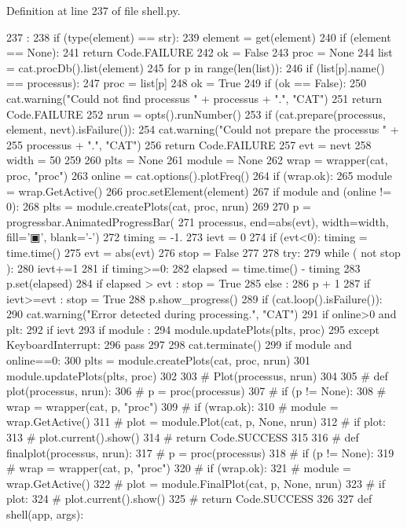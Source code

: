 Definition at line 237 of file shell.py.


\begin{DoxyCode}
237                                  :
238   if (type(element) == str):
239     element = get(element)
240     if (element == None):
241       return Code.FAILURE
242   ok = False
243   proc = None
244   list = cat.procDb().list(element)
245   for p in range(len(list)):
246     if (list[p].name() == processus):
247       proc = list[p]
248       ok = True
249   if (ok == False):
250     cat.warning("Could not find processus " + processus + ".", "CAT")
251     return Code.FAILURE
252   nrun = opts().runNumber()
253   if (cat.prepare(processus, element, nevt).isFailure()):
254     cat.warning("Could not prepare the processus " +
255                 processus + ".", "CAT")
256     return Code.FAILURE
257   evt = nevt
258   width = 50
259 
260   plts   = None
261   module = None
262   wrap = wrapper(cat, proc, "proc")
263   online  = cat.options().plotFreq()
264   if (wrap.ok):
265     module = wrap.GetActive()
266     proc.setElement(element)
267     if module and (online != 0):
268       plts = module.createPlots(cat, proc, nrun)        
269     
270   p = progressbar.AnimatedProgressBar(
271       processus, end=abs(evt), width=width, fill='▣', blank='-')
272   timing  = -1.
273   ievt    = 0
274   if (evt<0): timing = time.time()
275   evt    = abs(evt)
276   stop    = False
277 
278   try:
279     while ( not stop ):
280       ievt+=1
281       if timing>=0:
282         elapsed = time.time() - timing
283         p.set(elapsed)
284         if elapsed > evt : stop = True
285       else :
286         p + 1
287         if ievt>=evt : stop = True
288       p.show_progress()
289       if (cat.loop().isFailure()):
290         cat.warning("Error detected during processing.", "CAT")
291       if online>0 and plt:
292         if ievt%
293           if module :
294             module.updatePlots(plts, proc)
295   except KeyboardInterrupt:
296     pass
297 
298   cat.terminate()
299   if module and online==0:
300     plts = module.createPlots(cat, proc, nrun) 
301     module.updatePlots(plts, proc)
302 
303   #  Plot(processus, nrun)
304 
305 # def plot(processus, nrun):
306 #   p = proc(processus)
307 #   if (p != None):
308 #     wrap = wrapper(cat, p, "proc")
309 #     if (wrap.ok):
310 #       module = wrap.GetActive()
311 #       plot = module.Plot(cat, p, None, nrun)
312 #       if plot:
313 #         plot.current().show()
314 #   return Code.SUCCESS
315 
316 # def finalplot(processus, nrun):
317 #   p = proc(processus)
318 #   if (p != None):
319 #     wrap = wrapper(cat, p, "proc")
320 #     if (wrap.ok):
321 #       module = wrap.GetActive()
322 #       plot = module.FinalPlot(cat, p, None, nrun)
323 #       if plot:
324 #         plot.current().show()
325 #   return Code.SUCCESS
326 
327 
def shell(app, args):
\end{DoxyCode}
